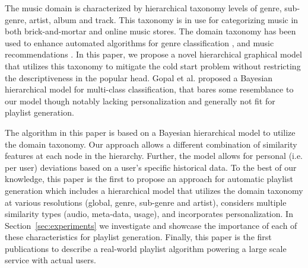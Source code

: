The music domain is characterized by hierarchical taxonomy levels of genre, sub-genre, artist, album and track. This taxonomy is in use for categorizing music in both brick-and-mortar and online music stores. The domain taxonomy has been used to enhance automated algorithms for genre classification \cite{DecoroEtAl_2007_BayeAggrForHier}, and music recommendations \cite{Dror2011,Mnih2012}.
In this paper, we propose a novel hierarchical graphical model that utilizes this taxonomy to mitigate the cold start problem without restricting the descriptiveness in the popular head.
Gopal et al. \cite{NIPS2012_4609} proposed a Bayesian hierarchical model for multi-class classification, that bares some resemblance to our model though notably lacking personalization and generally not fit for playlist generation. 


The algorithm in this paper is based on a Bayesian hierarchical model to utilize the domain taxonomy.
Our approach allows a different combination of similarity features at each node in the hierarchy. Further, the model allows for personal (i.e. per user) deviations based on a user's specific historical data.
To the best of our knowledge, this paper is the first to propose an approach for automatic  playlist generation which includes a hierarchical model that utilizes the domain taxonomy at various resolutions (global, genre, sub-genre and artist), considers multiple similarity types (audio, meta-data, usage), and incorporates personalization. 
In Section~\ref{sec:experiments} we investigate and showcase the importance of each of these characteristics for playlist generation.
Finally, this paper is the first publications to describe a real-world playlist algorithm powering a large scale service with actual users. 



